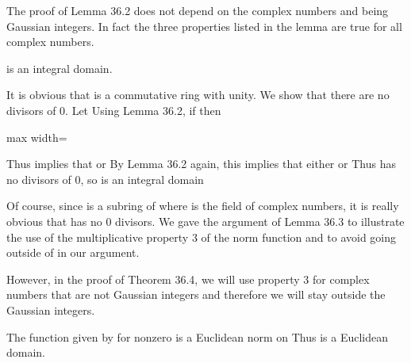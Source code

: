 \documentclass[11pt,oneside]{article}
\begin{document}
\BookNarrativetrue

\begin{BookBody}

The proof of Lemma 36.2 does not depend on the complex numbers \BookInline{\alpha } and \BookInline{\beta } being Gaussian integers. In fact the three properties listed in the lemma are true for all complex numbers.

  is an integral domain.

 It is obvious that  is a commutative ring with unity. We show that there are no divisors of 0. Let  Using Lemma 36.2, if  then

\begin{center}\begin{adjustbox}{max width=\linewidth}\end{adjustbox}\end{center}

\noindent Thus  implies that  or  By Lemma 36.2 again, this implies that either  or  Thus  has no divisors of 0, so  is an integral domain\BookEnd{\blacklozenge}

Of course, since  is a subring of  where  is the field of complex numbers, it is really obvious that  has no 0 divisors. We gave the argument of Lemma 36.3 to illustrate the use of the multiplicative property 3 of the norm function  and to avoid going outside of  in our argument.

However, in the proof of Theorem 36.4, we will use property 3 for complex numbers that are not Gaussian integers and therefore we will stay outside the Gaussian integers.

 The function \BookInline{\nu } given by  for nonzero  is a Euclidean norm on  Thus  is a Euclidean domain.


\end{BookBody}
\end{document}
